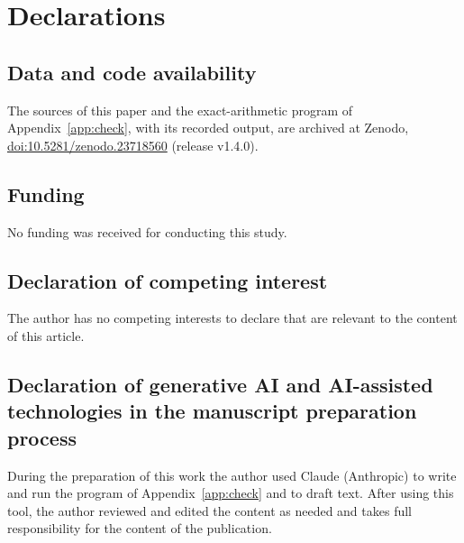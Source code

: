 \documentclass[11pt,reqno]{amsart}
\numberwithin{equation}{section}
\theoremstyle{plain}
\theoremstyle{definition}
\theoremstyle{remark}
\begin{document}
\section*{Declarations}

\subsection*{Data and code availability}
The sources of this paper and the exact-arithmetic program of
Appendix~\ref{app:check}, with its recorded output, are archived at Zenodo,
\href{https://doi.org/10.5281/zenodo.23718560}{doi:10.5281/zenodo.23718560} (release v1.4.0).

\subsection*{Funding}
No funding was received for conducting this study.

\subsection*{Declaration of competing interest}
The author has no competing interests to declare that are relevant to the
content of this article.

\subsection*{Declaration of generative AI and AI-assisted technologies in the manuscript preparation process}
During the preparation of this work the author used Claude (Anthropic) to
write and run the program of Appendix~\ref{app:check} and to draft text.
After using this tool, the author reviewed and edited the content as needed and
takes full responsibility for the content of the publication.
\end{document}
